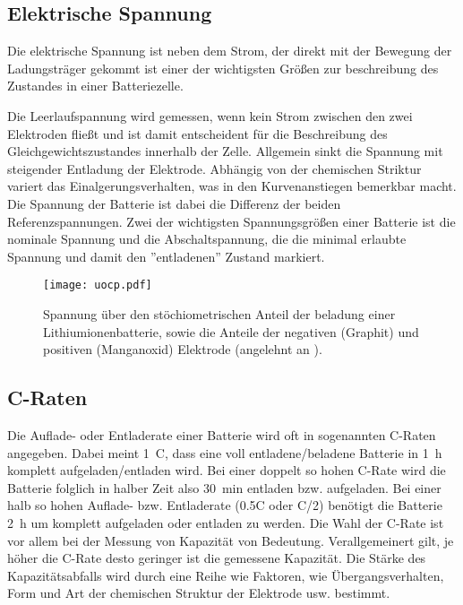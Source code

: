 \subsection{Elektrische Spannung}

Die elektrische Spannung ist neben dem Strom, der direkt mit der Bewegung der Ladungsträger gekommt ist einer der wichtigsten Größen zur beschreibung des Zustandes in einer Batteriezelle. 

Die Leerlaufspannung wird gemessen, wenn kein Strom zwischen den zwei Elektroden fließt und ist damit entscheident für die Beschreibung des Gleichgewichtszustandes innerhalb der Zelle.
Allgemein sinkt die Spannung mit steigender Entladung der Elektrode. Abhängig von der chemischen Striktur variert das Einalgerungsverhalten, was in den Kurvenanstiegen bemerkbar macht.
Die Spannung der Batterie ist dabei die Differenz der beiden Referenzspannungen.
Zwei der wichtigsten Spannungsgrößen einer Batterie ist die nominale Spannung und die Abschaltspannung, die die minimal erlaubte Spannung und damit den ''entladenen'' Zustand markiert.

\begin{figure}[h]
        \center
	\texttt{[image: uocp.pdf]}
		\caption{\label{fig:battery_voltage}Spannung über den stöchiometrischen Anteil der beladung einer Lithiumionenbatterie, sowie die Anteile der negativen (Graphit) und positiven (Manganoxid) Elektrode (angelehnt an ).}
\end{figure}

\subsection{C-Raten}
Die Auflade- oder Entladerate einer Batterie wird oft in sogenannten C-Raten angegeben. Dabei meint 1~C, dass eine voll entladene/beladene Batterie in 1~h komplett aufgeladen/entladen wird. Bei einer doppelt so hohen C-Rate wird die Batterie folglich in halber Zeit also 30~min entladen bzw. aufgeladen. Bei einer halb so hohen Auflade- bzw. Entladerate (0.5C oder C/2) benötigt die Batterie 2~h um komplett aufgeladen oder entladen zu werden.
Die Wahl der C-Rate ist vor allem bei der Messung von Kapazität von Bedeutung.
Verallgemeinert gilt, je höher die C-Rate desto geringer ist die gemessene Kapazität. Die Stärke des Kapazitätsabfalls wird durch eine Reihe wie Faktoren, wie Übergangsverhalten, Form und Art der chemischen Struktur der Elektrode usw. bestimmt.

